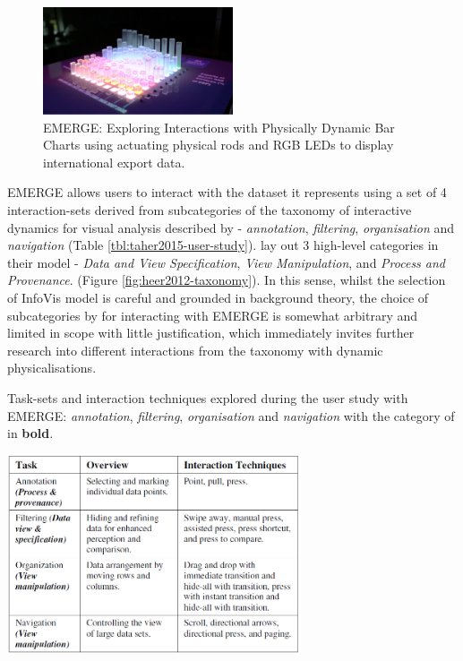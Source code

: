 \documentclass[11pt]{article}
\begin{document}
\begin{figure}[H]
\centering
\includegraphics[width=0.5\textwidth]{img/taher2015-emerge.png} 
\caption{EMERGE: Exploring Interactions with Physically Dynamic Bar Charts using actuating physical rods and RGB LEDs to display international export data.}\label{fig:taher2015-emerge}
\end{figure}

EMERGE allows users to interact with the dataset it represents using a set of 4 interaction-sets derived from subcategories of the taxonomy of interactive dynamics for visual analysis described by \citet{heer2012} - \textit{annotation}, \textit{filtering}, \textit{organisation} and \textit{navigation} (Table \ref{tbl:taher2015-user-study}). \citeauthor{heer2012} lay out 3 high-level categories in their model - \textit{Data and View Specification}, \textit{View Manipulation}, and \textit{Process and Provenance}. (Figure \ref{fig:heer2012-taxonomy}). In this sense, whilst the selection of InfoVis model is careful and grounded in background theory, the choice of subcategories by \citeauthor{taher2015} for interacting with EMERGE is somewhat arbitrary and limited in scope with little justification, which immediately invites further research into different interactions from the taxonomy with dynamic physicalisations.

\begin{table}[H]
\centering
\caption{Task-sets and interaction techniques explored during the user study with EMERGE: \textit{annotation}, \textit{filtering}, \textit{organisation} and \textit{navigation} with the category of \protect\citet{heer2012} in \textbf{bold}.}\label{tbl:taher2015-user-study}
\includegraphics[width=0.65\textwidth]{img/taher2015-user-study.png} 
\end{table}
\end{document}
